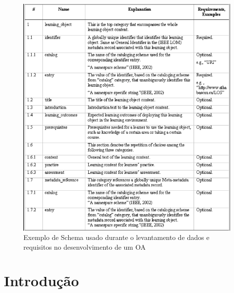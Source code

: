 \documentclass[12pt,openright,oneside,a4paper,english,french,spanish,brazil]{unifil}
\begin{document}
\begin{figure}[htb]
	\centering
	\includegraphics[scale=0.5]{images/Schema.png}
	\caption{Exemplo de Schema usado durante o levantamento de dados e requisitos no desenvolvimento de um OA}
	\label{img:schema}
\end{figure}

\cleardoublepage

\textual

\renewcommand{\ABNTEXchapterfont}{\fontfamily{cmr}\fontseries{b}\selectfont}
\renewcommand{\ABNTEXchapterfontsize}{\Large}

\renewcommand{\ABNTEXsectionfont}{\uppercase{\fontfamily{cmr}\fontseries{b}\selectfont}}
\renewcommand{\ABNTEXsectionfontsize}{\large}

\chapter{Introdução}
\end{document}
